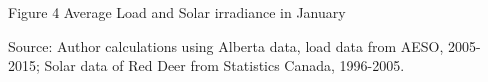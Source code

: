 Figure 4 Average Load and Solar irradiance in January

Source: Author calculations using Alberta data, load data from AESO,
2005-2015; Solar data of Red Deer from Statistics Canada, 1996-2005.
